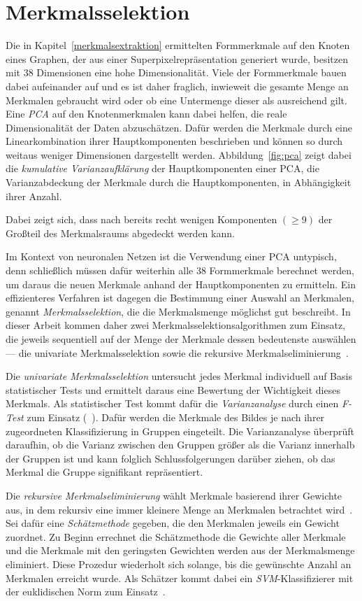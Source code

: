 \section{Merkmalsselektion}
\label{merkmalsselektion}

Die in Kapitel~\ref{merkmalsextraktion} ermittelten Formmerkmale auf den Knoten eines Graphen, der aus einer Superpixelrepräsentation generiert wurde, besitzen mit $38$ Dimensionen eine hohe Dimensionalität.
Viele der Formmerkmale bauen dabei aufeinander auf und es ist daher fraglich, inwieweit die gesamte Menge an Merkmalen gebraucht wird oder ob eine Untermenge dieser als ausreichend gilt.
Eine \emph{\gls{PCA}} auf den Knotenmerkmalen kann dabei helfen, die reale Dimensionalität der Daten abzuschätzen.
Dafür werden die Merkmale durch eine Linearkombination ihrer Hauptkomponenten beschrieben und können so durch weitaus weniger Dimensionen dargestellt werden.
Abbildung~\ref{fig:pca} zeigt dabei die \emph{kumulative Varianzaufklärung} der Hauptkomponenten einer \gls{PCA}, \dhe{} die Varianzabdeckung der Merkmale durch die Hauptkomponenten, in Abhängigkeit ihrer Anzahl.

Dabei zeigt sich, dass nach bereits recht wenigen Komponenten $\left(\geq 9\right)$ der Großteil des Merkmalsraums abgedeckt werden kann.

Im Kontext von neuronalen Netzen ist die Verwendung einer \gls{PCA} untypisch, denn schließlich müssen dafür weiterhin alle $38$ Formmerkmale berechnet werden, um daraus die neuen Merkmale anhand der Hauptkomponenten zu ermitteln.
Ein effizienteres Verfahren ist dagegen die Bestimmung einer Auswahl an Merkmalen, genannt \emph{Merkmalsselektion}, die die Merkmalsmenge möglichst gut beschreibt.
In dieser Arbeit kommen daher zwei Merkmalsselektionsalgorithmen zum Einsatz, die jeweils sequentiell auf der Menge der Merkmale dessen bedeutenste auswählen — die univariate Merkmalsselektion sowie die rekursive Merkmalseliminierung~\cite{scikitlearn}.

Die \emph{univariate Merkmalsselektion} untersucht jedes Merkmal individuell auf Basis statistischer Tests und ermittelt daraus eine Bewertung der Wichtigkeit dieses Merkmals.
Als statistischer Test kommt dafür die \emph{Varianzanalyse} durch einen \emph{F-Test} zum Einsatz (\vgl{}~\cite{scikitlearn}).
Dafür werden die Merkmale des Bildes je nach ihrer zugeordneten Klassifizierung in Gruppen eingeteilt.
Die Varianzanalyse überprüft daraufhin, ob die Varianz zwischen den Gruppen größer als die Varianz innerhalb der Gruppen ist und kann folglich Schlussfolgerungen darüber ziehen, ob das Merkmal die Gruppe signifikant repräsentiert.

Die \emph{rekursive Merkmalseliminierung} wählt Merkmale basierend ihrer Gewichte aus, in dem rekursiv eine immer kleinere Menge an Merkmalen betrachtet wird~\cite{scikitlearn}.
Sei dafür eine \emph{Schätzmethode} gegeben, die den Merkmalen jeweils ein Gewicht zuordnet.
Zu Beginn errechnet die Schätzmethode die Gewichte aller Merkmale und die Merkmale mit den geringsten Gewichten werden aus der Merkmalsmenge eliminiert.
Diese Prozedur wiederholt sich solange, bis die gewünschte Anzahl an Merkmalen erreicht wurde.
Als Schätzer kommt dabei ein \emph{\gls{SVM}}-Klassifizierer mit der euklidischen Norm zum Einsatz~\cite{scikitlearn}.
